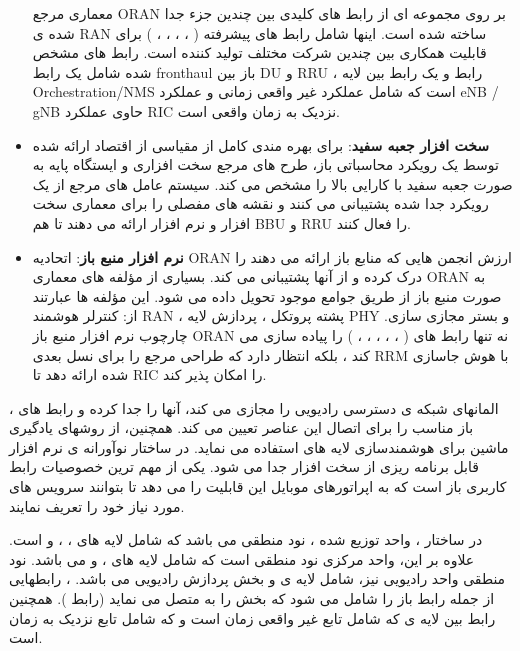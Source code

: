 \begin{itemize}
معماری مرجع ORAN بر روی مجموعه ای از رابط های کلیدی بین چندین جزء جدا شده ی RAN ساخته شده است.
اینها شامل رابط های  پیشرفته 
(
،
،
،
،
)
 برای قابلیت همکاری بین چندین شرکت مختلف تولید کننده است.
رابط های مشخص شده  شامل یک رابط fronthaul باز بین DU و RRU ، رابط  و یک رابط  بین لایه 
Orchestration/NMS 
است که شامل عملکرد
 غیر واقعی زمانی  و عملکرد eNB / gNB حاوی عملکرد RIC نزدیک به زمان واقعی 
است.
\item \textbf{سخت افزار جعبه سفید}:
برای بهره مندی کامل از مقیاسی از اقتصاد ارائه شده توسط یک رویکرد  محاسباتی باز،  
طرح های مرجع 
سخت افزاری و ایستگاه پایه به صورت جعبه سفید با کارایی بالا را مشخص می کند. 
سیستم عامل های مرجع از یک رویکرد جدا شده پشتیبانی می کنند و نقشه های مفصلی را برای معماری سخت افزار و نرم افزار ارائه می دهند تا هم BBU و RRU را فعال کنند. 
\item \textbf{نرم افزار منبع باز}:
اتحادیه ORAN ارزش انجمن هایی که منابع باز ارا‌ئه می دهند را درک کرده   
 و از آنها پشتیبانی می کند.
 بسیاری از مؤلفه های معماری ORAN به صورت منبع باز از طریق جوامع موجود تحویل داده می شود.
 این مؤلفه ها عبارتند از: کنترلر هوشمند RAN ، پشته پروتکل ، پردازش لایه PHY و بستر مجازی سازی.
  چارچوب نرم افزار منبع باز ORAN نه تنها رابط های 
(
،
،
،
،
،
)
  را پیاده سازی می کند ، بلکه انتظار دارد که طراحی مرجع را برای نسل بعدی RRM با هوش جاسازی شده ارائه دهد تا RIC را امکان پذیر کند.
\end{itemize}

،
 المانهای شبکه ی دسترسی رادیویی را مجازی می کند، آنها را جدا کرده و رابط های باز مناسب را 
برای اتصال این عناصر
تعیین می کند. همچنین، 
از روشهای یادگیری ماشین برای هوشمندسازی لایه های 
 استفاده می نماید. 
 در ساختار نوآورانه ی 
 نرم افزار قابل برنامه ریزی 
 از سخت افزار جدا می شود.
  یکی از مهم ترین خصوصیات
  رابط کاربری باز است که به اپراتورهای موبایل این قابلیت را می دهد تا بتوانند سرویس های مورد نیاز خود را تعریف نمایند.

در ساختار
،
واحد توزیع شده ،
نود منطقی می باشد که شامل لایه های 
،
،
و
است.
علاوه بر این، واحد مرکزی 
نود منطقی است که شامل لایه های 
،
و 
می باشد.
نود منطقی واحد رادیویی
نیز، شامل لایه ی 
و بخش پردازش رادیویی می باشد.
،
رابطهایی از جمله رابط 
باز را شامل می شود که بخش  را به  متصل می نماید
(رابط 
). 
همچنین
 رابط 
 بین لایه ی 
  که شامل 
  تابع غیر واقعی زمان است و 
  که شامل تابع نزدیک به زمان است. 


